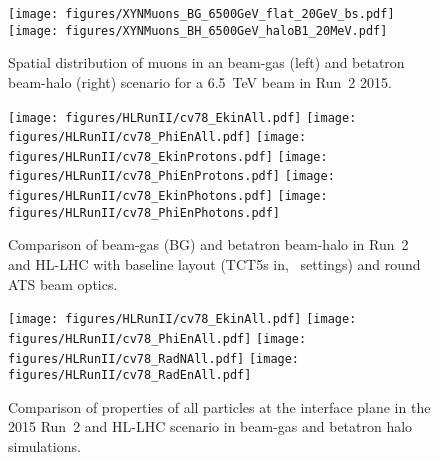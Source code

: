 \begin{figure}
  \centering
    \texttt{[image: figures/XYNMuons\_BG\_6500GeV\_flat\_20GeV\_bs.pdf]}  
    \texttt{[image: figures/XYNMuons\_BH\_6500GeV\_haloB1\_20MeV.pdf]}
  \caption{Spatial distribution of muons in an beam-gas (left) and betatron beam-halo (right) scenario for a 6.5~TeV beam in Run~2 2015. 
    \label{fig:XYNMuons2}}
\end{figure}

\begin{figure}
\begin{center}
  \texttt{[image: figures/HLRunII/cv78\_EkinAll.pdf]}
  \texttt{[image: figures/HLRunII/cv78\_PhiEnAll.pdf]}
  \texttt{[image: figures/HLRunII/cv78\_EkinProtons.pdf]}
  \texttt{[image: figures/HLRunII/cv78\_PhiEnProtons.pdf]}
  \texttt{[image: figures/HLRunII/cv78\_EkinPhotons.pdf]}
  \texttt{[image: figures/HLRunII/cv78\_PhiEnPhotons.pdf]}
\end{center}
\vspace{-0.6cm}
 \caption{Comparison of beam-gas (BG) and betatron beam-halo in Run~2 and HL-LHC with baseline layout (TCT5s in, \twosigmaret~settings) and round ATS beam optics.
  \label{fig:hlrun22}}
\end{figure}




\clearpage

\begin{figure}
\begin{center}
  \texttt{[image: figures/HLRunII/cv78\_EkinAll.pdf]}
  \texttt{[image: figures/HLRunII/cv78\_PhiEnAll.pdf]}
  \texttt{[image: figures/HLRunII/cv78\_RadNAll.pdf]}
  \texttt{[image: figures/HLRunII/cv78\_RadEnAll.pdf]}      
\end{center}
\vspace{-0.6cm}
 \caption{Comparison of properties of all particles at the interface plane in the 2015 Run~2 and HL-LHC scenario in beam-gas and betatron halo simulations.
  \label{fig:compHLRun2All}}
\end{figure}

